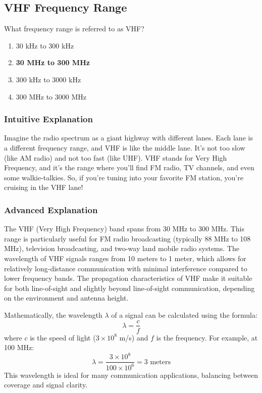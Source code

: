 \subsection{VHF Frequency Range}
\label{T3B08}

\begin{tcolorbox}[colback=gray!10!white,colframe=black!75!black,title=T3B08]
What frequency range is referred to as VHF?
\begin{enumerate}[label=\Alph*)]
    \item 30 kHz to 300 kHz
    \item \textbf{30 MHz to 300 MHz}
    \item 300 kHz to 3000 kHz
    \item 300 MHz to 3000 MHz
\end{enumerate}
\end{tcolorbox}

\subsubsection*{Intuitive Explanation}
Imagine the radio spectrum as a giant highway with different lanes. Each lane is a different frequency range, and VHF is like the middle lane. It’s not too slow (like AM radio) and not too fast (like UHF). VHF stands for Very High Frequency, and it’s the range where you’ll find FM radio, TV channels, and even some walkie-talkies. So, if you’re tuning into your favorite FM station, you’re cruising in the VHF lane!

\subsubsection*{Advanced Explanation}
The VHF (Very High Frequency) band spans from 30 MHz to 300 MHz. This range is particularly useful for FM radio broadcasting (typically 88 MHz to 108 MHz), television broadcasting, and two-way land mobile radio systems. The wavelength of VHF signals ranges from 10 meters to 1 meter, which allows for relatively long-distance communication with minimal interference compared to lower frequency bands. The propagation characteristics of VHF make it suitable for both line-of-sight and slightly beyond line-of-sight communication, depending on the environment and antenna height.

Mathematically, the wavelength \(\lambda\) of a signal can be calculated using the formula:
\[
\lambda = \frac{c}{f}
\]
where \(c\) is the speed of light (\(3 \times 10^8\) m/s) and \(f\) is the frequency. For example, at 100 MHz:
\[
\lambda = \frac{3 \times 10^8}{100 \times 10^6} = 3 \text{ meters}
\]
This wavelength is ideal for many communication applications, balancing between coverage and signal clarity.


